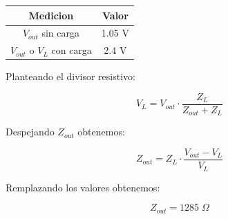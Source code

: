 \begin{table}[h]
    \centering
    \begin{tabular}{|c|c|}
    \hline
    \rowcolor[HTML]{C0C0C0} 
    \textbf{Medicion} & \textbf{Valor} \\ \hline
    $V_{out}$ sin carga            & 1.05  V         \\ \hline
    $V_{out}$ o $V_{L}$ con carga         & 2.4 V         \\ \hline
    \end{tabular}
\end{table}

Planteando el divisor resistivo:

\begin{equation}
    V_{L} = V_{out} \cdot \frac{Z_{L}}{Z_{out} + Z_L}
\end{equation}

Despejando $Z_{out}$ obtenemos:

\begin{equation}
    Z_{out} = Z_L \cdot \frac{V_{out} - V_L}{V_L}
\end{equation}

Remplazando los valores obtenemos:

\begin{equation}
    Z_{out} = 1285\; \Omega
\end{equation}

